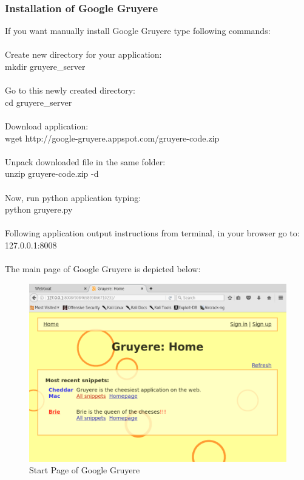 \documentclass[12pt, a4paper]{article}
\begin{document}
\subsubsection{Installation of Google Gruyere}
If you want manually install Google Gruyere type following commands:\\
\\
Create new directory for your application:\\
mkdir gruyere\_server\\
\\
Go to this newly created directory:\\
cd gruyere\_server\\
\\
Download application:\\
wget http://google-gruyere.appspot.com/gruyere-code.zip\\
\\
Unpack downloaded file in the same folder:\\
unzip gruyere-code.zip -d\\
\\
Now, run python application typing:\\
python gruyere.py\\
\\
Following application output instructions from terminal, in your browser go to:\\
127.0.0.1:8008\\
\\
The main page of Google Gruyere is depicted below:\\
\begin{figure}[H]
\includegraphics[width=1.0\textwidth]{googleGruyereStartPage.png}
\caption{Start Page of Google Gruyere}
\end{figure}
\end{document}
